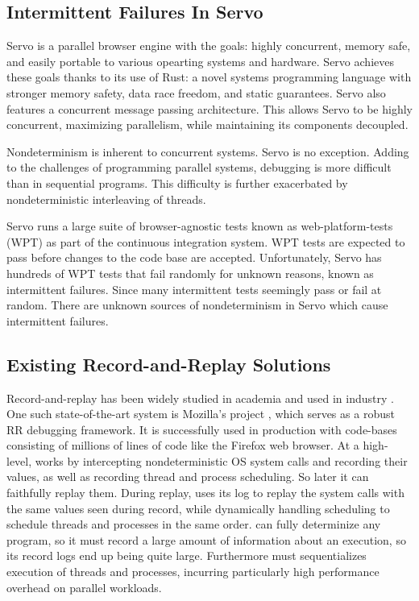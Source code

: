 \subsection{Intermittent Failures In Servo}
Servo \citep{servo} is a parallel browser engine with the goals: highly concurrent,
memory safe, and easily portable to various opearting systems and hardware. Servo achieves these goals thanks to its use of Rust: a novel systems programming language with stronger memory safety,
data race freedom, and static guarantees. Servo also features a concurrent message passing architecture. This allows Servo to be highly concurrent, maximizing parallelism,
while maintaining its components decoupled.

Nondeterminism is inherent to concurrent systems. Servo is no exception. Adding to
the challenges of programming parallel systems, debugging is more difficult than in
sequential programs. This difficulty is further exacerbated by nondeterministic
interleaving of threads.

Servo runs a large suite of browser-agnostic tests known as web-platform-tests (WPT) \cite{wpt}
as part of the continuous integration system. WPT tests are expected to pass before
changes to the code base are accepted. Unfortunately, Servo has hundreds of WPT tests that
fail randomly for unknown reasons, known as intermittent failures. Since many intermittent
tests seemingly pass or fail at random. There are unknown sources of nondeterminism in
Servo which cause intermittent failures.

\subsection{Existing Record-and-Replay Solutions}
Record-and-replay has been widely studied in academia \cite{arnold, r2, panda, review-reverse-debugging, hunt_ddos:_2013, castor} and used in industry \cite{retrace}. One
such state-of-the-art system is Mozilla's  project \citep{mozilla-rr}, which serves
as a robust RR debugging framework. It is successfully used in production
with code-bases consisting of millions of lines of code like the Firefox web browser.
At a high-level,  works by intercepting nondeterministic OS system calls and recording
their values, as well as recording thread and process scheduling. So later it can faithfully
replay them. During replay,  uses its log to replay the system calls with the same
values seen during record, while dynamically handling scheduling to schedule threads
and processes in the same order.  can fully determinize any program,
so it must record a large amount of information about an execution, so its record logs
end up being quite large. Furthermore  must sequentializes execution of threads and
processes, incurring particularly high performance overhead on parallel workloads.

